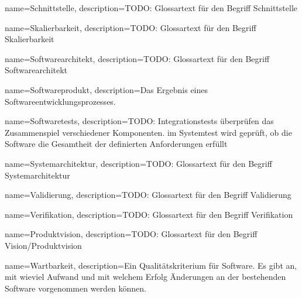 {
    name=Schnittstelle,
    description={TODO: Glossartext f\"ur den Begriff Schnittstelle}
}

{
    name=Skalierbarkeit,
    description={TODO: Glossartext f\"ur den Begriff Skalierbarkeit}
}

{
    name=Softwarearchitekt,
    description={TODO: Glossartext f\"ur den Begriff Softwarearchitekt}
}

{
    name=Softwareprodukt,
    description={Das Ergebnis eines Softwareentwicklungsprozesses.}
}

{
    name=Softwaretests,
    description={TODO: Integrationstests überprüfen das Zusammenspiel verschiedener Komponenten.
    	im Systemtest wird geprüft, ob die Software die Gesamtheit der definierten Anforderungen erfüllt}
}

{
    name=Systemarchitektur,
    description={TODO: Glossartext f\"ur den Begriff Systemarchitektur}
}

{
    name=Validierung,
    description={TODO: Glossartext f\"ur den Begriff Validierung}
}

{
    name=Verifikation,
    description={TODO: Glossartext f\"ur den Begriff Verifikation}
}

{
	name=Produktvision,
	description={TODO: Glossartext f\"ur den Begriff Vision/Produktvision}
}

{
    name=Wartbarkeit,
    description={Ein Qualit\"atskriterium f\"ur Software. Es gibt an, mit wieviel Aufwand und mit welchem Erfolg \"Anderungen an der bestehenden Software vorgenommen werden k\"onnen.}
}